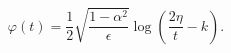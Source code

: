\begin{equation}
  \label{eq:KS-sol}
  \varphi(t)=\frac{1}{2}\sqrt{\frac{1-\alpha^2}{\epsilon}}
  \log\left(\frac{2\eta}{t}-k\right).
\end{equation}

